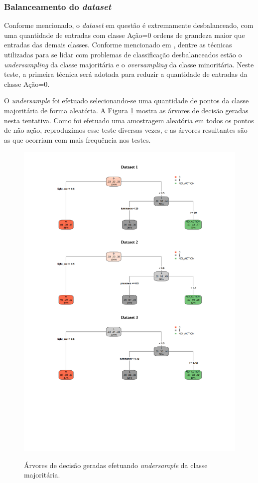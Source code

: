 \subsubsection{Balanceamento do \textit{dataset}}
Conforme mencionado, o \textit{dataset} em questão é extremamente desbalanceado, com uma quantidade de entradas com classe Ação=0 ordens de grandeza maior que entradas das demais classes. Conforme mencionado em \cite{han2005}, dentre as técnicas utilizadas para se lidar com problemas de classificação desbalanceados estão o \textit{undersampling} da classe majoritária e o \textit{oversampling} da classe minoritária. Neste teste, a primeira técnica será adotada para reduzir a quantidade de entradas da classe Ação=0.

O \textit{undersample} foi efetuado selecionando-se uma quantidade de pontos da classe majoritária de forma aleatória. A Figura \ref{fig:teste_4} mostra as árvores de decisão geradas nesta tentativa. Como foi efetuado uma amostragem aleatória em todos os pontos de não ação, reproduzimos esse teste diversas vezes, e as árvores resultantes são as que ocorriam com mais frequência nos testes.

\begin{figure}[hp]
	\centering
	\caption{Árvores de decisão geradas efetuando \textit{undersample} da classe majoritária.}
  \includegraphics[width=\textwidth]{imagens/teste_learning/4.pdf}
  \label{fig:teste_4}  
\end{figure}
 
